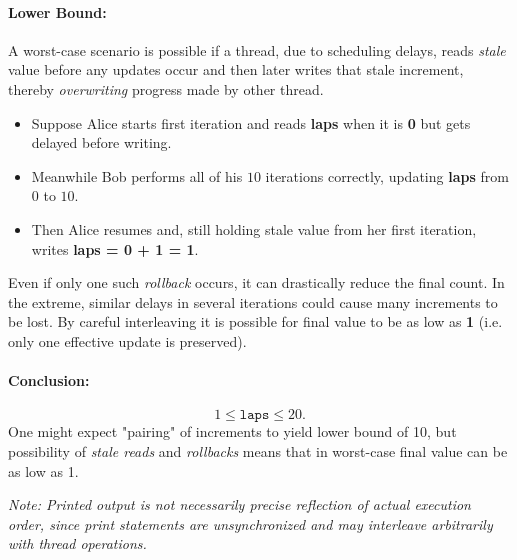 \documentclass{article}
\begin{document}
\begin{enumerate}[label=\textbf{\makebox[1cm][l]{\Huge\text{(\stylishfont\alph*)}}}, leftmargin=!, labelindent=0pt]
\paragraph{Lower Bound:}
A worst-case scenario is possible if a thread, due to scheduling delays, reads
\emph{stale} value before any updates occur and then later writes that
stale increment, thereby \emph{overwriting} progress made by other thread.
\begin{itemize}
    \item Suppose Alice starts first iteration and reads
    \textbf{laps} when it is \textbf{0} but gets delayed before writing.
    \item Meanwhile Bob performs all of his $10$ iterations correctly,
    updating \textbf{laps} from $0$ to $10$.
    \item Then Alice resumes and, still holding stale value from
    her first iteration, writes \textbf{laps = 0 + 1 = 1}.
\end{itemize}
Even if only one such \emph{rollback} occurs, it can drastically
reduce the final count. In the extreme, similar delays in several
iterations could cause many increments to be lost. By careful
interleaving it is possible for final value to be as low as
\textbf{1} (i.e. only one effective update is preserved).

\paragraph{Conclusion:}
\[
1 \le \texttt{laps} \le 20.
\]
One might expect "pairing" of increments to yield lower bound
of 10, but possibility of \emph{stale reads} and \emph{rollbacks}
means that in worst-case final value can be as low as 1.


\emph{Note: Printed output is not necessarily precise reflection
of actual execution order, since print statements are unsynchronized
and may interleave arbitrarily with thread operations.}


\end{enumerate}


\newpage
\printbibliography
\end{document}
